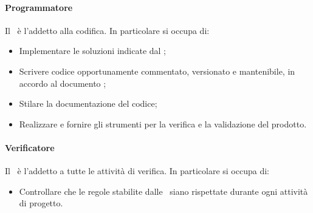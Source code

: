 \documentclass[../NormeDiProgetto.tex]{subfiles}
\begin{document}
				\paragraph{Programmatore\\}
					Il \programmatore\ è l'addetto alla codifica. In particolare si occupa di:
					\begin{itemize}
						\item Implementare le soluzioni indicate dal \progettista;
						\item Scrivere codice opportunamente commentato, versionato e mantenibile, in
						accordo al documento \normediprogetto;
						\item Stilare la documentazione del codice;
						\item Realizzare e fornire gli strumenti per la verifica e la validazione
						del prodotto.
					\end{itemize}
				\paragraph{Verificatore\\}
					Il \verificatore\ è l'addetto a tutte le attività di verifica.
					In particolare si occupa di:
					\begin{itemize}
						\item Controllare che le regole stabilite dalle \normediprogetto\ siano
						rispettate durante ogni attività di progetto.
					\end{itemize}
\end{document}
